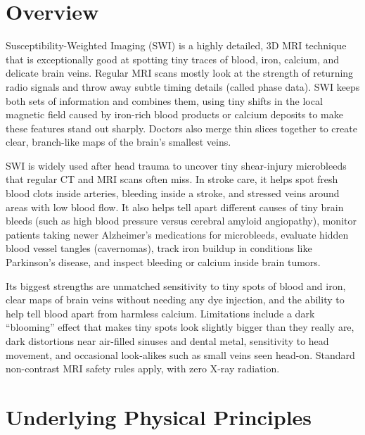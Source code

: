 \label{ch:infographic-swi}

\section{Overview}

Susceptibility-Weighted Imaging (SWI) is a highly detailed, 3D MRI technique that is exceptionally good at spotting tiny traces of blood, iron, calcium, and delicate brain veins. Regular MRI scans mostly look at the strength of returning radio signals and throw away subtle timing details (called phase data). SWI keeps both sets of information and combines them, using tiny shifts in the local magnetic field caused by iron-rich blood products or calcium deposits to make these features stand out sharply. Doctors also merge thin slices together to create clear, branch-like maps of the brain's smallest veins.

SWI is widely used after head trauma to uncover tiny shear-injury microbleeds that regular CT and MRI scans often miss. In stroke care, it helps spot fresh blood clots inside arteries, bleeding inside a stroke, and stressed veins around areas with low blood flow. It also helps tell apart different causes of tiny brain bleeds (such as high blood pressure versus cerebral amyloid angiopathy), monitor patients taking newer Alzheimer's medications for microbleeds, evaluate hidden blood vessel tangles (cavernomas), track iron buildup in conditions like Parkinson's disease, and inspect bleeding or calcium inside brain tumors.

Its biggest strengths are unmatched sensitivity to tiny spots of blood and iron, clear maps of brain veins without needing any dye injection, and the ability to help tell blood apart from harmless calcium. Limitations include a dark ``blooming'' effect that makes tiny spots look slightly bigger than they really are, dark distortions near air-filled sinuses and dental metal, sensitivity to head movement, and occasional look-alikes such as small veins seen head-on. Standard non-contrast MRI safety rules apply, with zero X-ray radiation.

\section{Underlying Physical Principles}

